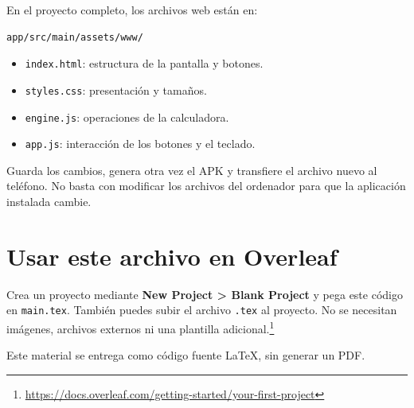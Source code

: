 \documentclass[12pt,a4paper]{article}
\begin{document}
En el proyecto completo, los archivos web están en:

\begin{verbatim}
app/src/main/assets/www/
\end{verbatim}

\begin{itemize}
    \item \texttt{index.html}: estructura de la pantalla y botones.
    \item \texttt{styles.css}: presentación y tamaños.
    \item \texttt{engine.js}: operaciones de la calculadora.
    \item \texttt{app.js}: interacción de los botones y el teclado.
\end{itemize}

Guarda los cambios, genera otra vez el APK y transfiere el archivo nuevo al teléfono. No basta con modificar los archivos del ordenador para que la aplicación instalada cambie.

\section{Usar este archivo en Overleaf}

Crea un proyecto mediante \textbf{New Project > Blank Project} y pega este código en \texttt{main.tex}. También puedes subir el archivo \texttt{.tex} al proyecto. No se necesitan imágenes, archivos externos ni una plantilla adicional.\footnote{\url{https://docs.overleaf.com/getting-started/your-first-project}}

Este material se entrega como código fuente LaTeX, sin generar un PDF.
\end{document}
